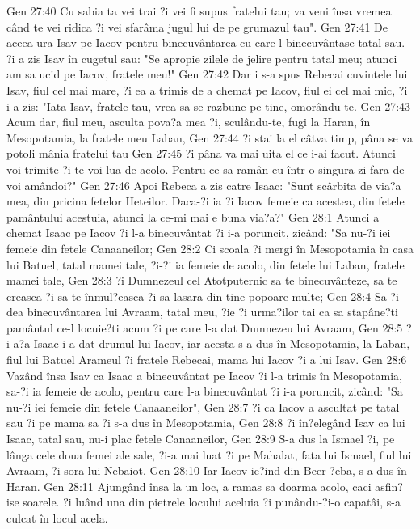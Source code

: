Gen 27:40  Cu sabia ta vei trai ?i vei fi supus fratelui tau; va veni însa vremea când te vei ridica ?i vei sfarâma jugul lui de pe grumazul tau".
Gen 27:41  De aceea ura Isav pe Iacov pentru binecuvântarea cu care-l binecuvântase tatal sau. ?i a zis Isav în cugetul sau: "Se apropie zilele de jelire pentru tatal meu; atunci am sa ucid pe Iacov, fratele meu!"
Gen 27:42  Dar i s-a spus Rebecai cuvintele lui Isav, fiul cel mai mare, ?i ea a trimis de a chemat pe Iacov, fiul ei cel mai mic, ?i i-a zis: "Iata Isav, fratele tau, vrea sa se razbune pe tine, omorându-te.
Gen 27:43  Acum dar, fiul meu, asculta pova?a mea ?i, sculându-te, fugi la Haran, în Mesopotamia, la fratele meu Laban,
Gen 27:44  ?i stai la el câtva timp, pâna se va potoli mânia fratelui tau
Gen 27:45  ?i pâna va mai uita el ce i-ai facut. Atunci voi trimite ?i te voi lua de acolo. Pentru ce sa ramân eu într-o singura zi fara de voi amândoi?"
Gen 27:46  Apoi Rebeca a zis catre Isaac: "Sunt scârbita de via?a mea, din pricina fetelor Heteilor. Daca-?i ia ?i Iacov femeie ca acestea, din fetele pamântului acestuia, atunci la ce-mi mai e buna via?a?"
Gen 28:1  Atunci a chemat Isaac pe Iacov ?i l-a binecuvântat ?i i-a poruncit, zicând: "Sa nu-?i iei femeie din fetele Canaaneilor;
Gen 28:2  Ci scoala ?i mergi în Mesopotamia în casa lui Batuel, tatal mamei tale, ?i-?i ia femeie de acolo, din fetele lui Laban, fratele mamei tale,
Gen 28:3  ?i Dumnezeul cel Atotputernic sa te binecuvânteze, sa te creasca ?i sa te înmul?easca ?i sa lasara din tine popoare multe;
Gen 28:4  Sa-?i dea binecuvântarea lui Avraam, tatal meu, ?ie ?i urma?ilor tai ca sa stapâne?ti pamântul ce-l locuie?ti acum ?i pe care l-a dat Dumnezeu lui Avraam,
Gen 28:5  ?i a?a Isaac i-a dat drumul lui Iacov, iar acesta s-a dus în Mesopotamia, la Laban, fiul lui Batuel Arameul ?i fratele Rebecai, mama lui Iacov ?i a lui Isav.
Gen 28:6  Vazând însa Isav ca Isaac a binecuvântat pe Iacov ?i l-a trimis în Mesopotamia, sa-?i ia femeie de acolo, pentru care l-a binecuvântat ?i i-a poruncit, zicând: "Sa nu-?i iei femeie din fetele Canaaneilor",
Gen 28:7  ?i ca Iacov a ascultat pe tatal sau ?i pe mama sa ?i s-a dus în Mesopotamia,
Gen 28:8  ?i în?elegând Isav ca lui Isaac, tatal sau, nu-i plac fetele Canaaneilor,
Gen 28:9  S-a dus la Ismael ?i, pe lânga cele doua femei ale sale, ?i-a mai luat ?i pe Mahalat, fata lui Ismael, fiul lui Avraam, ?i sora lui Nebaiot.
Gen 28:10  Iar Iacov ie?ind din Beer-?eba, s-a dus în Haran.
Gen 28:11  Ajungând însa la un loc, a ramas sa doarma acolo, caci asfin?ise soarele. ?i luând una din pietrele locului aceluia ?i punându-?i-o capatâi, s-a culcat în locul acela.
